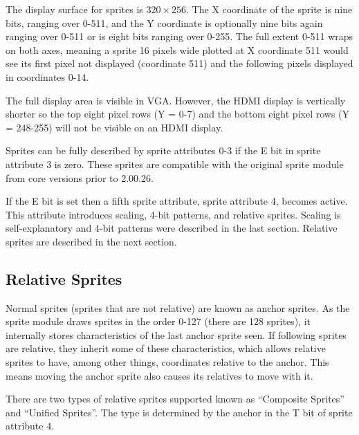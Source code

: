 The display surface for sprites is $320\times256$. The X coordinate of
the sprite is nine bits, ranging over 0-511, and the Y coordinate is
optionally nine bits again ranging over 0-511 or is eight bits ranging
over 0-255. The full extent 0-511 wraps on both axes, meaning a sprite
16 pixels wide plotted at X coordinate 511 would see its first pixel
not displayed (coordinate 511) and the following pixels displayed in
coordinates 0-14.

The full display area is visible in VGA. However, the HDMI display is
vertically shorter so the top eight pixel rows (Y = 0-7) and the
bottom eight pixel rows (Y = 248-255) will not be visible on an HDMI
display.

Sprites can be fully described by sprite attributes 0-3 if the E bit
in sprite attribute 3 is zero. These sprites are compatible with the
original sprite module from core versions prior to 2.00.26.

If the E bit is set then a fifth sprite attribute, sprite attribute 4,
becomes active. This attribute introduces scaling, 4-bit patterns, and
relative sprites. Scaling is self-explanatory and 4-bit patterns were
described in the last section. Relative sprites are described in the
next section.

\subsection{Relative Sprites}
Normal sprites (sprites that are not relative) are known as anchor
sprites. As the sprite module draws sprites in the order 0-127 (there
are 128 sprites), it internally stores characteristics of the last
anchor sprite seen. If following sprites are relative, they inherit
some of these characteristics, which allows relative sprites to have,
among other things, coordinates relative to the anchor. This means
moving the anchor sprite also causes its relatives to move with it.

There are two types of relative sprites supported known as “Composite
Sprites” and “Unified Sprites”. The type is determined by the anchor
in the T bit of sprite attribute 4.


